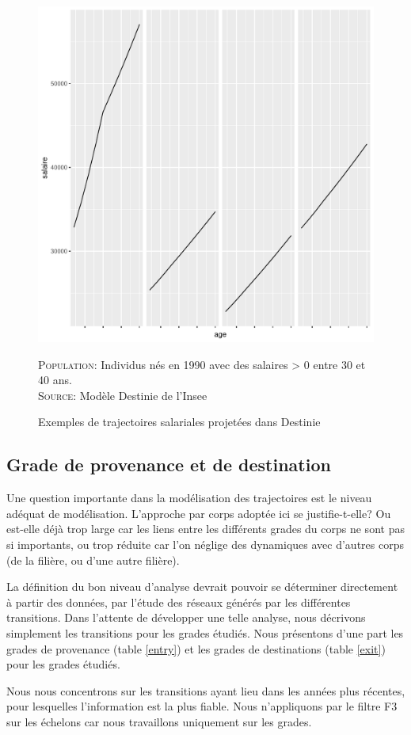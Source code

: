 \documentclass[11pt,a4paper]{article}
\begin{document}
\begin{figure}[H] 
\caption{Exemples de trajectoires salariales projetées dans Destinie}
\label{trajectories_D} 
\includegraphics[width=1\linewidth, height = 0.5\linewidth]{trajectoires_D.pdf} 
\begin{minipage}{12cm}
\footnotesize
\textsc{Population:} Individus nés en 1990 avec des salaires > 0 entre 30 et 40 ans. \\
\textsc{Source:} Modèle Destinie de l'Insee
\end{minipage}
\end{figure}


\bigskip

\subsection{Grade de provenance et de destination}


Une question importante dans la modélisation des trajectoires est le niveau adéquat de modélisation. L'approche par corps adoptée ici se justifie-t-elle? Ou est-elle déjà trop large car les liens entre les différents grades du corps ne sont pas si importants, ou trop réduite car l'on néglige des dynamiques avec d'autres corps (de la filière, ou d'une autre filière). 

La définition du bon niveau d'analyse devrait pouvoir se déterminer directement à partir des données, par l'étude des réseaux générés par les différentes transitions. Dans l'attente de développer une telle analyse, nous décrivons simplement les transitions pour les grades étudiés. Nous présentons d'une part les grades de provenance (table \ref{entry}) et les grades de destinations (table \ref{exit}) pour les grades étudiés. 

Nous nous concentrons sur les transitions ayant lieu dans les années plus récentes, pour lesquelles l'information est la plus fiable. Nous n'appliquons par le filtre F3 sur les échelons car nous travaillons uniquement sur les grades. 
\end{document}
